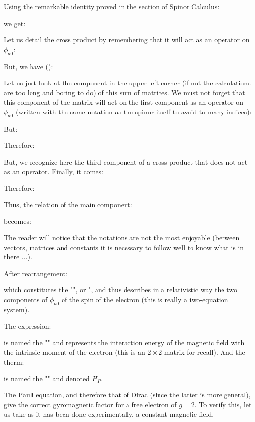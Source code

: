 	Using the remarkable identity proved in the section of Spinor Calculus:
	
	we get:
	
	Let us detail the cross product by remembering that it will act as an operator on $\phi_{a0}$:
	
	But, we have ():
	
	Let us just look at the component in the upper left corner (if not the calculations are too long and boring to do) of this sum of matrices. We must not forget that this component of the matrix will act on the first component as an operator on $\phi_{a0}$ (written with the same notation as the spinor itself to avoid to many indices):
	
	But:
	
	Therefore:
	 
	But, we recognize here the third component of a cross product that does not act as an operator. Finally, it comes:
	
	Therefore:
	
	Thus, the relation of the main component:
	
	becomes:
	
	The reader will notice that the notations are not the most enjoyable (between vectors, matrices and constants it is necessary to follow well to know what is in there ...).

	After rearrangement:
	
	which constitutes the "", or ", and thus describes in a relativistic way the two components of $\phi_{a0}$ of the spin of the electron (this is really a two-equation system).

	The expression:
	
	is named the "" and represents the interaction energy of the magnetic field with the intrinsic moment of the electron (this is an $2\times 2$ matrix for recall). And the therm:
	
	is named the "" and denoted $H_P$.

	The Pauli equation, and therefore that of Dirac (since the latter is more general), give the correct gyromagnetic factor for a free electron of $g=2$. To verify this, let us take as it has been done experimentally, a constant magnetic field.


